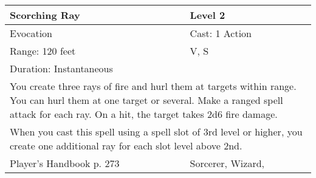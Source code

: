 \documentclass[11pt]{report}
\begin{document}
\begin{table}[H]
	\begin{tabular}{||p{6cm}|p{6cm}||}
		\hline\hline
		\bf{Scorching Ray} & Level 2\\ \hline
		Evocation & Cast: 1 Action\\ \hline
		Range: 120 feet & V, S\\ \hline
		Duration: Instantaneous & \\ \hline
		\multicolumn{2}{||p{12cm}||}{You create three rays of fire and hurl them at targets within range. You can hurl them at one target or several. Make a ranged spell attack for each ray. On a hit, the target takes 2d6 fire damage.}\\ \hline
		\multicolumn{2}{||p{12cm}||}{When you cast this spell using a spell slot of 3rd level or higher, you create one additional ray for each slot level above 2nd.}\\ \hline
Player's Handbook p. 273 & Sorcerer, Wizard, \\ \hline\hline
	\end{tabular}
\end{table}
\end{document}
